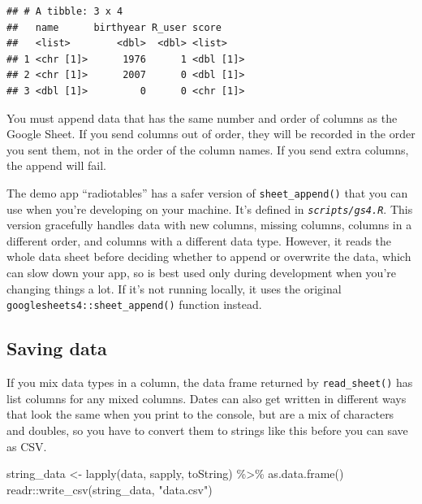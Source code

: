 \documentclass[
  oneside]{book}
\newenvironment{Shaded}{\begin{snugshade}}{\end{snugshade}}
\newcommand{\FunctionTok}[1]{\textcolor[rgb]{0.00,0.00,0.00}{#1}}
\newcommand{\NormalTok}[1]{#1}
\newcommand{\OtherTok}[1]{\textcolor[rgb]{0.56,0.35,0.01}{#1}}
\newcommand{\SpecialCharTok}[1]{\textcolor[rgb]{0.00,0.00,0.00}{#1}}
\newcommand{\StringTok}[1]{\textcolor[rgb]{0.31,0.60,0.02}{#1}}
\begin{document}
\begin{verbatim}
## # A tibble: 3 x 4
##   name      birthyear R_user score    
##   <list>        <dbl>  <dbl> <list>   
## 1 <chr [1]>      1976      1 <dbl [1]>
## 2 <chr [1]>      2007      0 <dbl [1]>
## 3 <dbl [1]>         0      0 <chr [1]>
\end{verbatim}

\begin{dangerous}
You must append data that has the same number and order of columns as the Google Sheet. If you send columns out of order, they will be recorded in the order you sent them, not in the order of the column names. If you send extra columns, the append will fail.

\end{dangerous}

The demo app ``radiotables'' has a safer version of \texttt{sheet\_append}\texttt{()} that you can use when you're developing on your machine. It's defined in \textit{\texttt{scripts/gs4.R}}. This version gracefully handles data with new columns, missing columns, columns in a different order, and columns with a different data type. However, it reads the whole data sheet before deciding whether to append or overwrite the data, which can slow down your app, so is best used only during development when you're changing things a lot. If it's not running locally, it uses the original \texttt{googlesheets4::sheet\_append}\texttt{()} function instead.

\hypertarget{gs4_save}{%
\subsection{Saving data}\label{gs4_save}}

If you mix data types in a column, the data frame returned by \texttt{read\_sheet}\texttt{()} has list columns for any mixed columns. Dates can also get written in different ways that look the same when you print to the console, but are a mix of characters and doubles, so you have to convert them to strings like this before you can save as CSV.

\begin{Shaded}
\begin{Highlighting}[]
\NormalTok{string\_data }\OtherTok{\textless{}{-}} \FunctionTok{lapply}\NormalTok{(data, sapply, toString) }\SpecialCharTok{\%\textgreater{}\%} \FunctionTok{as.data.frame}\NormalTok{()}
\NormalTok{readr}\SpecialCharTok{::}\FunctionTok{write\_csv}\NormalTok{(string\_data, }\StringTok{"data.csv"}\NormalTok{)}
\end{Highlighting}
\end{Shaded}
\end{document}
